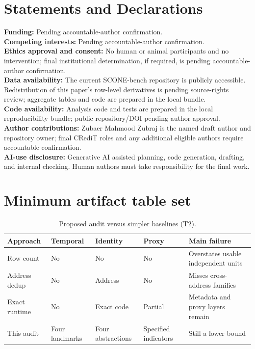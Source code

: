 \documentclass[10pt]{article}
\newcommand{\dataset}{SCONE-bench}
\begin{document}
\section*{Statements and Declarations}
\textbf{Funding:} Pending accountable-author confirmation.\\
\textbf{Competing interests:} Pending accountable-author confirmation.\\
\textbf{Ethics approval and consent:} No human or animal participants and no intervention; final institutional determination, if required, is pending accountable-author confirmation.\\
\textbf{Data availability:} The current \dataset{} repository is publicly accessible. Redistribution of this paper's row-level derivatives is pending source-rights review; aggregate tables and code are prepared in the local bundle.\\
\textbf{Code availability:} Analysis code and tests are prepared in the local reproducibility bundle; public repository/DOI pending author approval.\\
\textbf{Author contributions:} Zubaer Mahmood Zubraj is the named draft author and repository owner; final CRediT roles and any additional eligible authors require accountable confirmation.\\
\textbf{AI-use disclosure:} Generative AI assisted planning, code generation, drafting, and internal checking. Human authors must take responsibility for the final work.


{\small}

\clearpage
\appendix
\section{Minimum artifact table set}
\begin{table}[h]
\centering\footnotesize
\caption{Proposed audit versus simpler baselines (T2).}
\begin{tabularx}{\linewidth}{lXXXX}
\toprule Approach & Temporal & Identity & Proxy & Main failure \\
\midrule
Row count & No & No & No & Overstates usable independent units \\
Address dedup & No & Address & No & Misses cross-address families \\
Exact runtime & No & Exact code & Partial & Metadata and proxy layers remain \\
This audit & Four landmarks & Four abstractions & Specified indicators & Still a lower bound \\
\bottomrule
\end{tabularx}
\end{table}
\end{document}
